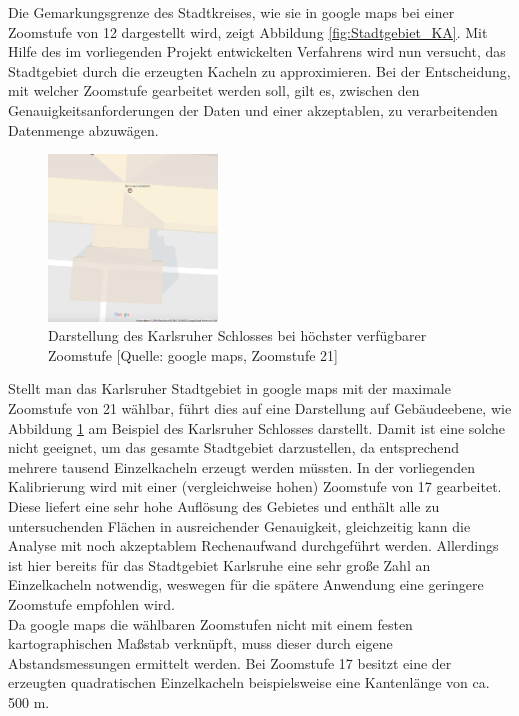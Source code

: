 \documentclass[12pt,a4paper]{scrartcl}
\begin{document}
%
Die Gemarkungsgrenze des Stadtkreises, wie sie in google maps bei einer Zoomstufe von \num{12} dargestellt wird, zeigt Abbildung \ref{fig:Stadtgebiet_KA}. Mit Hilfe des im vorliegenden Projekt entwickelten Verfahrens wird nun versucht, das Stadtgebiet durch die erzeugten Kacheln zu approximieren. Bei der Entscheidung, mit welcher Zoomstufe gearbeitet werden soll, gilt es, zwischen den Genauigkeitsanforderungen  der Daten und einer akzeptablen, zu verarbeitenden Datenmenge abzuwägen. 
%
\begin{figure}
  \centering
    \includegraphics[width=0.4\textwidth]{KA_Schloss_zoom21.PNG}
    \caption{Darstellung des Karlsruher Schlosses bei höchster verfügbarer Zoomstufe [Quelle: google maps, Zoomstufe 21]}
    \label{fig:Schloss_KA}
\end{figure}
%
Stellt man das Karlsruher Stadtgebiet in google maps mit der maximale Zoomstufe von 21 wählbar, führt dies auf eine Darstellung auf Gebäudeebene, wie Abbildung \ref{fig:Schloss_KA} am Beispiel des Karlsruher Schlosses darstellt. Damit ist eine solche nicht geeignet, um das gesamte Stadtgebiet darzustellen, da entsprechend mehrere tausend Einzelkacheln erzeugt werden müssten. In der vorliegenden Kalibrierung wird mit einer (vergleichweise hohen) Zoomstufe von 17 gearbeitet. Diese liefert eine sehr hohe Auflösung des Gebietes und enthält alle zu untersuchenden Flächen in ausreichender Genauigkeit, gleichzeitig kann die Analyse mit noch akzeptablem Rechenaufwand durchgeführt werden. Allerdings ist hier bereits für das Stadtgebiet Karlsruhe eine sehr große Zahl an Einzelkacheln notwendig, weswegen für die spätere Anwendung eine geringere Zoomstufe empfohlen wird.\\
\newline
Da google maps die wählbaren Zoomstufen nicht mit einem festen kartographischen Maßstab verknüpft, muss dieser durch eigene Abstandsmessungen ermittelt werden. Bei Zoomstufe 17 besitzt eine der erzeugten quadratischen Einzelkacheln beispielsweise eine Kantenlänge von ca. \num{500} \si{\metre}.\\
\end{document}

